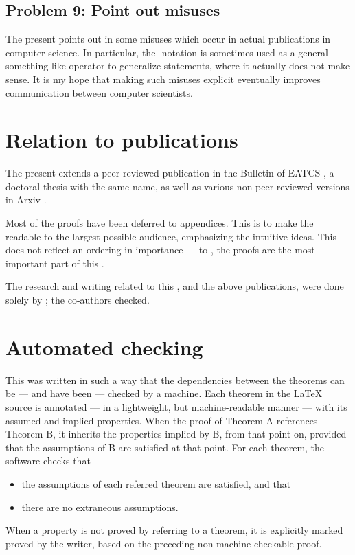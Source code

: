 \documentclass[b5paper, english, oneside]{memoir}
\begin{document}
\subsection{Problem 9: Point out misuses}

The present \manuscript{} points out in  some misuses which occur in actual publications in computer science. In particular, the -notation is sometimes used as a general something-like operator to generalize statements, where it actually does not make sense. It is my hope that making such misuses explicit eventually improves communication between computer scientists.

\section{Relation to publications}

The present \manuscript{} extends a peer-reviewed publication in the Bulletin of EATCS \cite{ONotationBeatcs}, a doctoral thesis with the same name, as well as various non-peer-reviewed versions in Arxiv \cite{ONotationArxiv}. 

Most of the proofs have been deferred to appendices. This is to make the \manuscript{} readable to the largest possible audience, emphasizing the intuitive ideas. This does not reflect an ordering in importance --- to \me{}, the proofs are the most important part of this \manuscript{}.

The research and writing related to this \manuscript{}, and the above publications, were done solely by \kr; the co-authors checked.

\section{Automated checking}

This \manuscript{} was written in such a way that the dependencies between the theorems can be --- and have been --- checked by a machine. Each theorem in the \LaTeX{} source is annotated --- in a lightweight, but machine-readable manner --- with its assumed and implied properties. When the proof of Theorem A references Theorem B, it inherits the properties implied by B, from that point on, provided that the assumptions of B are satisfied at that point. For each theorem, the software checks that
\begin{itemize}
\item the assumptions of each referred theorem are satisfied, and that
\item there are no extraneous assumptions.
\end{itemize}
When a property is not proved by referring to a theorem, it is explicitly marked proved by the writer, based on the preceding non-machine-checkable proof. 
\end{document}
